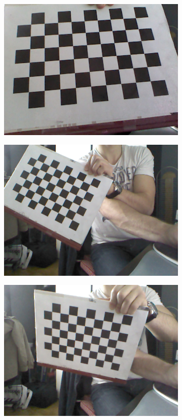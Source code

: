\begin{figure}
\begin{subfigure}{.5\textwidth}
  \centering
  \includegraphics[width=0.8\linewidth]{images/calib1.png}
\end{subfigure}
\begin{subfigure}{.5\textwidth}
  \centering
  \includegraphics[width=0.8\linewidth]{images/calib2.png}
\end{subfigure}
\begin{subfigure}{.5\textwidth}
  \centering
  \includegraphics[width=0.8\linewidth]{images/calib3.png}

\end{subfigure}
\end{figure}
